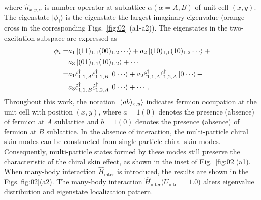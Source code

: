 \documentclass[longbibliography, aps, prx, amsmath, amssymb, amsfonts, twocolumn,superscriptaddress, footinbib]{revtex4-1}
\begin{document}
	where 
	$\hat{n}_{x,y,\alpha}$ is number operator at sublattice $\alpha (\alpha=A,B)$ of unit cell $(x,y)$.
	The eigenstate $\vert \phi_i \rangle$ is the eigenstate the largest imaginary eigenvalue (orange cross in the corresponding Figs.~\ref{fig:02} (a1-a2)). The eigenstates in the two-excitation subspace are expressed as 
	\begin{equation}
		\begin{split}
			\phi_i =& a_1 \ket{(11)_{1,1}(00)_{1,2}\cdots} + a_2 \ket{(10)_{1,1}(10)_{1,2}\cdots} + \\
			&a_3 \ket{(01)_{1,1}(10)_{1,2}} + \cdots\\
			=& a_1 \hat{c}_{1,1,A}^{\dagger}\hat{c}_{1,1,B}^{\dagger} \ket{0\cdots} + a_2 \hat{c}_{1,1,A}^{\dagger}\hat{c}_{1,2,A}^{\dagger} \ket{0\cdots} + \\
			& a_3 \hat{c}_{1,1,B}^{\dagger}\hat{c}_{1,2,A}^{\dagger} \ket{0\cdots} + \cdots.
		\end{split}
	\end{equation}
	Throughout this work, the notation $\ket{(ab)_{x,y}}$ indicates fermion occupation at the unit cell with position $(x,y)$, where $a=1(0)$ denotes the presence (absence) of fermion at $A$ sublattice and $b=1(0)$ denotes the presence (absence) of fermion at $B$ sublattice.
	In the absence of interaction, the multi-particle chiral skin modes can be constructed from single-particle chiral skin modes. Consequently, multi-particle states formed by these modes still preserve the characteristic of the chiral skin effect, as shown in the inset of Fig.~\ref{fig:02}(a1).
	When many-body interaction $\hat{H}_{\text{inter}}$ is introduced, the results are shown in the Figs.\ref{fig:02}(a2). The many-body interaction $\hat{H}_{\text{inter}}$($U_{\text{inter}}=1.0$) alters eigenvalue distribution and eigenstate localization pattern. 
\end{document}
